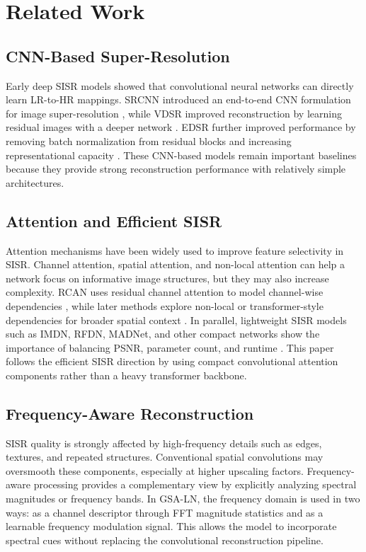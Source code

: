 \documentclass[conference]{IEEEtran}
\begin{document}
\section{Related Work}

\subsection{CNN-Based Super-Resolution}

Early deep SISR models showed that convolutional neural networks can directly learn LR-to-HR mappings. SRCNN introduced an end-to-end CNN formulation for image super-resolution \cite{dong2016srcnn}, while VDSR improved reconstruction by learning residual images with a deeper network \cite{kim2016vdsr}. EDSR further improved performance by removing batch normalization from residual blocks and increasing representational capacity \cite{lim2017edsr}. These CNN-based models remain important baselines because they provide strong reconstruction performance with relatively simple architectures.

\subsection{Attention and Efficient SISR}

Attention mechanisms have been widely used to improve feature selectivity in SISR. Channel attention, spatial attention, and non-local attention can help a network focus on informative image structures, but they may also increase complexity. RCAN uses residual channel attention to model channel-wise dependencies \cite{zhang2018rcan}, while later methods explore non-local or transformer-style dependencies for broader spatial context \cite{liu2020nlsn,liang2021swinir}. In parallel, lightweight SISR models such as IMDN, RFDN, MADNet, and other compact networks show the importance of balancing PSNR, parameter count, and runtime \cite{hui2019imdn,liu2020rfdn,lan2021madnet}. This paper follows the efficient SISR direction by using compact convolutional attention components rather than a heavy transformer backbone.

\subsection{Frequency-Aware Reconstruction}

SISR quality is strongly affected by high-frequency details such as edges, textures, and repeated structures. Conventional spatial convolutions may oversmooth these components, especially at higher upscaling factors. Frequency-aware processing provides a complementary view by explicitly analyzing spectral magnitudes or frequency bands. In GSA-LN, the frequency domain is used in two ways: as a channel descriptor through FFT magnitude statistics and as a learnable frequency modulation signal. This allows the model to incorporate spectral cues without replacing the convolutional reconstruction pipeline.
\end{document}
